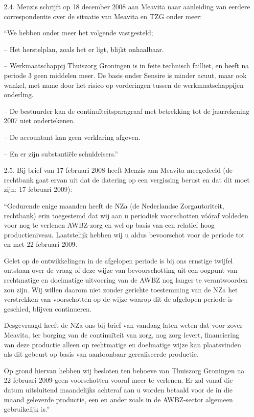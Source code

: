 \documentclass[
  dutch,
  a4paper,
]{article}
\begin{document}
2.4. Menzis schrijft op 18 december 2008 aan Meavita naar aanleiding van eerdere correspondentie over de situatie van Meavita en TZG onder meer:

``We hebben onder meer het volgende vastgesteld;

-- Het herstelplan, zoals het er ligt, blijkt onhaalbaar.

-- Werkmaatschappij Thuiszorg Groningen is in feite technisch failliet, en heeft na periode 3 geen middelen meer. De basis onder Sensire is minder acuut, maar ook wankel, met name door het risico op vorderingen tussen de werkmaatschappijen onderling.

-- De bestuurder kan de continuïteitsparagraaf met betrekking tot de jaarrekening 2007 niet ondertekenen.

-- De accountant kan geen verklaring afgeven.

-- En er zijn substantiële schuldeisers.''

2.5. Bij brief van 17 februari 2008 heeft Menzis aan Meavita meegedeeld (de rechtbank gaat ervan uit dat de datering op een vergissing berust en dat dit moet zijn: 17 februari 2009):

``Gedurende enige maanden heeft de NZa (de Nederlandse Zorgautoriteit, rechtbank) erin toegestemd dat wij aan u periodiek voorschotten vóóraf voldeden voor nog te verlenen AWBZ-zorg en wel op basis van een relatief hoog productieniveau. Laatstelijk hebben wij u aldus bevoorschot voor de periode tot en met 22 februari 2009.

Gelet op de ontwikkelingen in de afgelopen periode is bij ons ernstige twijfel ontstaan over de vraag of deze wijze van bevoorschotting uit een oogpunt van rechtmatige en doelmatige uitvoering van de AWBZ nog langer te verantwoorden zou zijn. Wij willen daarom niet zonder gerichte toestemming van de NZa het verstrekken van voorschotten op de wijze waarop dit de afgelopen periode is geschied, blijven continueren.

Desgevraagd heeft de NZa ons bij brief van vandaag laten weten dat voor zover Meavita, ter borging van de continuïteit van zorg, nog zorg levert, financiering van deze productie alleen op rechtmatige en doelmatige wijze kan plaatsvinden als dit gebeurt op basis van aantoonbaar gerealiseerde productie.

Op grond hiervan hebben wij besloten ten behoeve van Thuiszorg Groningen na 22 februari 2009 geen voorschotten vooraf meer te verlenen. Er zal vanaf die datum uitsluitend maandelijks achteraf aan u worden betaald voor de in die maand geleverde productie, een en ander zoals in de AWBZ-sector algemeen gebruikelijk is.''
\end{document}
